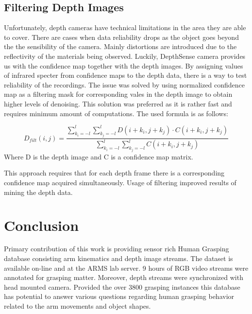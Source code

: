 \documentclass[journal]{IEEEtran}
\begin{document}
\subsection{Filtering Depth Images}

Unfortunately, depth cameras have technical limitations in the area they are able to cover. There are cases when data reliability drops as the object goes beyond the the sensibility of the camera. Mainly distortions are introduced due to the reflectivity of the materials being observed. Luckily, DepthSense camera provides us with the confidence map together with the depth images. By assigning values of infrared specter from confidence maps to the depth data, there is a way to test reliability of the recordings. The issue was solved by using normalized confidence map as a filtering mask for corresponding vales in the depth image to obtain higher levels of denoising. This solution was preferred as it is rather fast and requires minimum amount of computations.\cite{IEEEhowto: Saudabayev}  The used formula is as follows:

\begin{equation}
D_{filt}(i,j)=\frac{\sum_{k_i=-l}^{l}\sum_{k_j=-l}^{l}D(i+k_i, j+k_j)\cdot{C(i+k_i, j+k_j)}}{\sum_{k_i=-l}^{l}\sum_{k_j=-l}^{l}C(i+k_i, j+k_j)}
\end{equation}
Where D is the depth image and C is a confidence map matrix.

This approach requires that for each depth frame there is a corresponding confidence map acquired simultaneously. Usage of filtering improved results of mining the depth data.




\section{Conclusion}
Primary contribution of this work is providing sensor rich Human Grasping database consisting arm kinematics and depth image streams. The dataset is available on-line and at the ARMS lab server. 9 hours of RGB video streams were annotated for grasping matter. Moreover, depth streams were synchronized with head mounted camera. Provided the over 3800 grasping instances this database has potential to answer various questions regarding human grasping behavior related to the arm movements and object shapes. 





\ifCLASSOPTIONcaptionsoff
  \newpage
\fi
\end{document}
